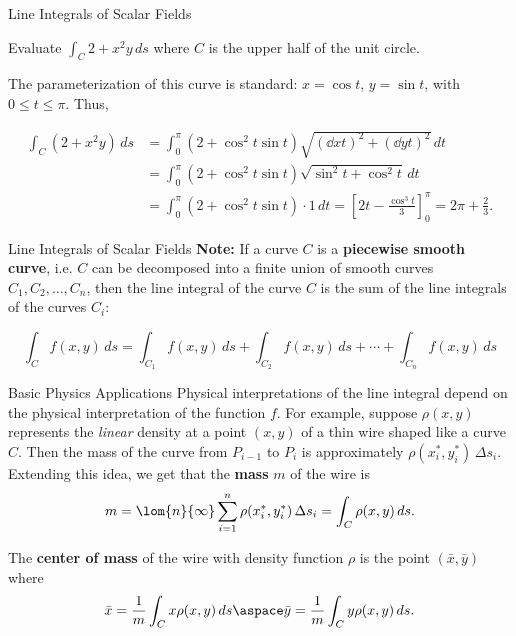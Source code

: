 \documentclass[11pt,english,
handout
]{beamer}
\begin{document}
\begin{frame}[t]{Line Integrals of Scalar Fields}
\small
\begin{example}
Evaluate $\int_C2+x^2y\,ds$ where $C$ is the upper half of the unit circle.

\lspace
The parameterization of this curve is standard: $x=\cos t$, $y=\sin t$, with $0\leq t \leq \pi$. \pause Thus,

\begin{align*}
\int_C(2+x^2y)\,ds&=\int_0^\pi(2+\cos^2t\sin t)\sqrt{\left(\dd{x}{t}\right)^2+\left(\dd{y}{t}\right)^2}\,dt\\[2mm]
&=\int_0^\pi(2+\cos^2t\sin t)\sqrt{\sin^2t+\cos^2t}\,dt\\[2mm]
&=\int_0^\pi(2+\cos^2t\sin t)\cdot 1\,dt=\left[2t-\frac{\cos^3t}{3}\right]_0^\pi=2\pi+\frac{2}{3}.
\end{align*}
\end{example}

\end{frame}















\begin{frame}{Line Integrals of Scalar Fields}
\small
\textbf{Note:} If a curve $C$ is a \textbf{piecewise smooth curve}, i.e. $C$ can be decomposed into a finite union of smooth curves $C_1,C_2,\ldots,C_n$, then the line integral of the curve $C$ is the sum of the line integrals of the curves $C_i$:

\[
\boxed{\int_Cf(x,y)\,ds=\int_{C_1}f(x,y)\,ds+\int_{C_2}f(x,y)\,ds+\cdots+\int_{C_n}f(x,y)\,ds}
\]
\end{frame}














\begin{frame}[t]{Basic Physics Applications}
\small
Physical interpretations of the line integral depend on the physical interpretation of the function $f$. \pause For example, suppose $\rho(x,y)$ represents the \textit{linear} density at a point $(x,y)$ of a thin wire shaped like a curve $C$. \pause Then the mass of the curve from $P_{i-1}$ to $P_i$ is approximately $\rho(x_i^*,y_i^*)\,\Delta s_i$. \pause Extending this idea, we get that the \textbf{mass} $m$ of the wire is
\[
m=\lom{n}{\infty}\sum_{i=1}^n\rho(x_i^*,y_i^*)\,\Delta s_i=\int_C\rho(x,y)\,ds.
\]\pause

The \textbf{center of mass} of the wire with density function $\rho$ is the point $(\bar{x},\bar{y})$ where
\[
\bar{x}=\frac{1}{m}\int_Cx\rho(x,y)\,ds\aspace\bar{y}=\frac{1}{m}\int_Cy\rho(x,y)\,ds.
\]
\end{frame}
\end{document}
